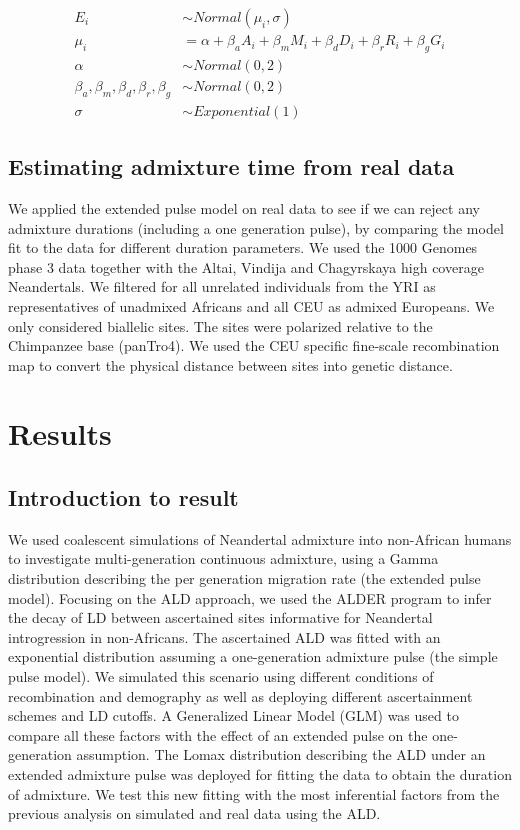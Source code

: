 \documentclass[]{article}
\begin{document}
\begin{equation}\label{eq:8}
\begin{split}
E_i &\sim Normal(\mu_i,\sigma) \\
\mu_i &= \alpha + \beta_aA_i + \beta_mM_i + \beta_dD_i + \beta_rR_i + \beta_gG_i \\
\alpha &\sim Normal(0,2) \\
\beta_a,\beta_m,\beta_d,\beta_r,\beta_g &\sim Normal(0,2) \\
\sigma &\sim Exponential(1)
\end{split}
\end{equation}

\subsection{Estimating admixture time from real data}\label{Estimating admixture time from real data}

We applied the extended pulse model on real data to see if we can reject any admixture durations (including a one generation pulse), by comparing the model fit to the data for different duration parameters.
We used the 1000 Genomes phase 3 data together with the Altai, Vindija and Chagyrskaya high coverage Neandertals.  We filtered for all unrelated individuals from the YRI as representatives of unadmixed Africans and all CEU as admixed Europeans. We only considered biallelic sites. The sites were polarized relative to the Chimpanzee base (panTro4). We used the CEU specific fine-scale recombination map \citep{spence_inference_2019} to convert the physical distance between sites into genetic distance. 

\section{Results}\label{results}

\subsection{Introduction to result}\label{introduction to result}

We used coalescent simulations of Neandertal admixture into non-African humans to investigate multi-generation continuous admixture, using a Gamma distribution describing the per generation migration rate (the extended pulse model). Focusing on the ALD approach, we used the ALDER program to infer the decay of LD between ascertained sites informative for Neandertal introgression in non-Africans. The ascertained ALD was fitted with an exponential distribution assuming a one-generation admixture pulse (the simple pulse model).  We simulated this scenario using different conditions of recombination and demography as well as deploying different ascertainment schemes and LD cutoffs. A Generalized Linear Model (GLM) was used to compare all these factors with the effect of an extended pulse on the one-generation assumption. The Lomax distribution describing the ALD under an extended admixture pulse was deployed for fitting the data to obtain the duration of admixture. We test this new fitting with the most inferential factors from the previous analysis on simulated and real data using the ALD.
\end{document}
